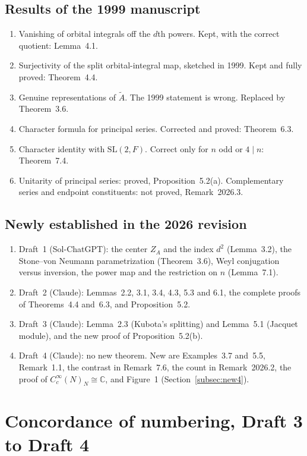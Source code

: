 \documentclass[12pt,letterpaper]{article}
\newcommand{\At}{\widetilde A}
\newcommand{\ZA}{Z_A}
\newcommand{\SL}{\mathrm{SL}}
\begin{document}
\subsection{Results of the 1999 manuscript}
\begin{enumerate}[leftmargin=*]
\item Vanishing of orbital integrals off the $d$th powers. Kept, with
  the correct quotient: Lemma~4.1.
\item Surjectivity of the split orbital-integral map, sketched in 1999.
  Kept and fully proved: Theorem~4.4.
\item Genuine representations of $\At$. The 1999 statement is wrong.
  Replaced by Theorem~3.6.
\item Character formula for principal series. Corrected and proved:
  Theorem~6.3.
\item Character identity with $\SL(2,F)$. Correct only for $n$ odd or
  $4\mid n$: Theorem~7.4.
\item Unitarity of principal series: proved,
  Proposition~5.2(a). Complementary series and endpoint
  constituents: not proved, Remark~2026.3.
\end{enumerate}

\subsection{Newly established in the 2026 revision}
\begin{enumerate}[leftmargin=*]
\item Draft~1 (Sol-ChatGPT): the center $\ZA$ and the index $d^2$
  (Lemma~3.2), the Stone--von Neumann parametrization
  (Theorem~3.6), Weyl conjugation versus inversion, the power map
  and the restriction on $n$ (Lemma~7.1).
\item Draft~2 (Claude): Lemmas~2.2, 3.1, 3.4, 4.3,
  5.3 and 6.1, the complete proofs of Theorems~4.4
  and~6.3, and Proposition~5.2.
\item Draft~3 (Claude): Lemma~2.3 (Kubota's splitting) and
  Lemma~5.1 (Jacquet module), and the new proof of
  Proposition~5.2(b).
\item Draft~4 (Claude): no new theorem. New are
  Examples~3.7 and~5.5, Remark~1.1, the contrast in
  Remark~7.6, the count in Remark~2026.2, the proof of
  $C_c^\infty(N)_N\cong\mathbb C$, and Figure~1
  (Section~\ref{subsec:new4}).
\end{enumerate}

\section{Concordance of numbering, Draft 3 to Draft 4}\label{sec:conc4}
\end{document}
